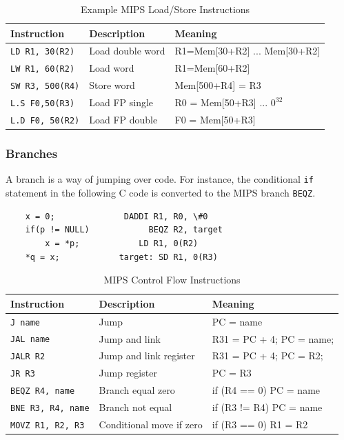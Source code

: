 \documentclass{article}
\begin{document}
\begin{table}[ht]
  \centering
  \caption{Example MIPS Load/Store Instructions}
  \begin{tabular}{
  		>{}m{1.1in} 
  		>{}m{1.2in} 
  		>{}m{2.1in}
  		}
    \toprule
    \textbf{Instruction} & \textbf{Description} & \textbf{Meaning}  \\ 
    \midrule
	\texttt{LD R1, 30(R2)} & Load double word &  R1=Mem[30+R2] ... Mem[30+R2]	\\
		\texttt{LW R1, 60(R2)} & Load word & R1=Mem[60+R2]	\\
	\texttt{SW R3, 500(R4)} & Store word & Mem[500+R4] = R3	\\
	\texttt{L.S F0,50(R3)} & Load FP single &  R0 = Mem[50+R3] ... $0^{32}$	\\
	\texttt{L.D F0, 50(R2)} & Load FP double &   F0 = Mem[50+R3]	\\

	\bottomrule
  \end{tabular}
\end{table}


\subsubsection{Branches}A branch is a way of jumping over code. For instance, the conditional \texttt{if} statement in the following C code is converted to the MIPS branch \texttt{BEQZ}.

\singlespacing
\begin{Verbatim} 
	x = 0;				DADDI R1, R0, \#0
	if(p != NULL)			 BEQZ R2, target
    	x = *p;			   LD R1, 0(R2)
	*q = x;		       target: SD R1, 0(R3)

\end{Verbatim}

\begin{table}[ht]
  \centering
  \caption{MIPS Control Flow Instructions}
  \begin{tabular}{
  		>{}m{1.2in} 
  		>{}m{1.5in} 
  		>{}m{1.8in}
  		}
    \toprule
    \textbf{Instruction} & \textbf{Description} & \textbf{Meaning}  \\ 
    \midrule
	\texttt{J name} 	& Jump             			& PC = name 	\\
	\texttt{JAL name} 	& Jump and link    			& R31 = PC + 4; PC = name; \\
	\texttt{JALR R2} 	& Jump and link register 	& R31 = PC + 4; PC = R2; \\
	\texttt{JR R3} 		& Jump register 	 		& PC = R3 \\
	\texttt{BEQZ R4, name} 		& Branch equal zero & if (R4 == 0) PC = name \\
	\texttt{BNE R3, R4, name} 	& Branch not equal  & if (R3 != R4) PC = name \\
	\texttt{MOVZ R1, R2, R3} 	& Conditional move if zero  & if (R3 == 0) R1 = R2 \\

	\bottomrule
  \end{tabular}
\end{table}
\end{document}
